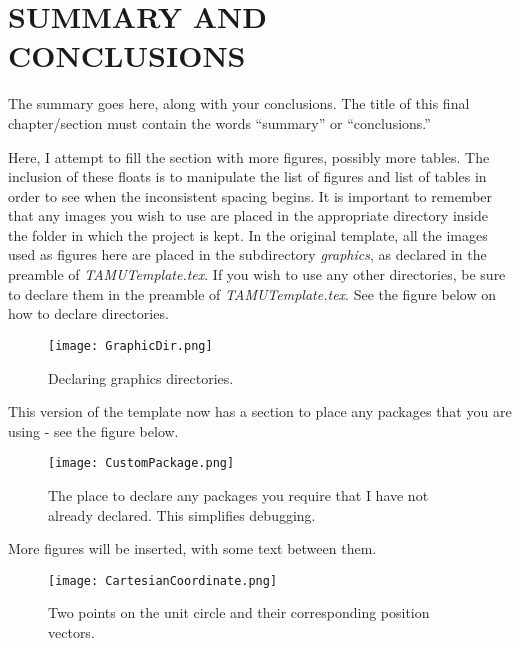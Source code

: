 

\chapter{SUMMARY AND CONCLUSIONS \label{cha:Summary}}

The summary goes here, along with your conclusions. The title of this final chapter/section must contain the words ``summary'' or ``conclusions.''

Here, I attempt to fill the section with more figures, possibly more tables. The inclusion of these floats is to manipulate the list of figures and list of tables in order to see when the inconsistent spacing begins. It is important to remember that any images you wish to use are placed in the appropriate directory inside the folder in which the project is kept. In the original template, all the images used as figures here are placed in the subdirectory \textit{graphics}, as declared in the preamble of \textit{TAMUTemplate.tex}. If you wish to use any other directories, be sure to declare them in the preamble of \textit{TAMUTemplate.tex}. See the figure below on how to declare directories.

\begin{figure}[h!]
	\centering
	\texttt{[image: GraphicDir.png]}
	\caption{Declaring graphics directories.}
\end{figure}

This version of the template now has a section to place any packages that you are using - see the figure below.

\begin{figure}[!h]
	\centering
	\texttt{[image: CustomPackage.png]}
	\caption{The place to declare any packages you require that I have not already declared. This simplifies debugging.}
\end{figure}

More figures will be inserted, with some text between them.

\begin{figure}[!h]
	\centering
	\texttt{[image: CartesianCoordinate.png]}
	\caption{Two points on the unit circle and their corresponding position vectors.}
\end{figure}

